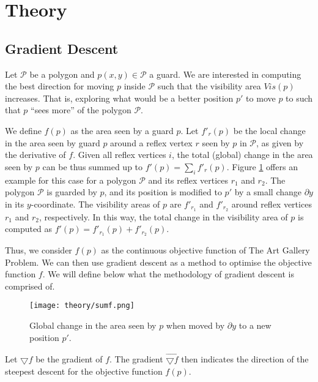 \section{Theory}
\label{sec:theory}

\subsection{Gradient Descent}

Let $\mathcal P$ be a polygon and $p(x, y) \in \mathcal P$ a guard. We are interested in computing the best direction for moving $p$ inside $\mathcal P$ such that the visibility area $Vis(p)$ increases. That is, exploring what would be a better position $p'$ to move $p$ to such that $p$ ``sees more'' of the polygon $\mathcal P$. 

We define $f(p)$ as the area seen by a guard $p$. Let $f'_r(p)$ be the local change in the area seen by guard $p$ around a reflex vertex $r$ seen by $p$ in $\mathcal P$, as given by the derivative of $f$. Given all reflex vertices $i$, the total (global) change in the area seen by $p$ can be thus summed up to $f'(p) = \sum_i f'_r(p)$. Figure \ref{fig:sumf} offers an example for this case for a polygon $\mathcal P$ and its reflex vertices $r_1$ and $r_2$. The polygon $\mathcal P$ is guarded by $p$, and its position is modified to $p'$ by a small change $\partial y$ in its $y$-coordinate. The visibility areas of $p$ are $f'_{r_1}$ and $f'_{r_2}$ around reflex vertices $r_1$ and $r_2$, respectively. In this way, the total change in the visibility area of $p$ is computed as $f'(p) = f'_{r_1}(p) + f'_{r_2}(p)$.

Thus, we consider $f(p)$ as the continuous objective function of The Art Gallery Problem. We can then use gradient descent as a method to optimise the objective function $f$. We will define below what the methodology of gradient descent is comprised of.

\begin{figure}[h!]
    \centering
    \texttt{[image: theory/sumf.png]}
    \caption{Global change in the area seen by $p$ when moved by $\partial y$ to a new position $p'$.}
    \label{fig:sumf}
\end{figure}


Let $\bigtriangledown f$ be the gradient of $f$. The gradient $\vec{\bigtriangledown f}$ then indicates the direction of the steepest descent for the objective function $f(p)$.

